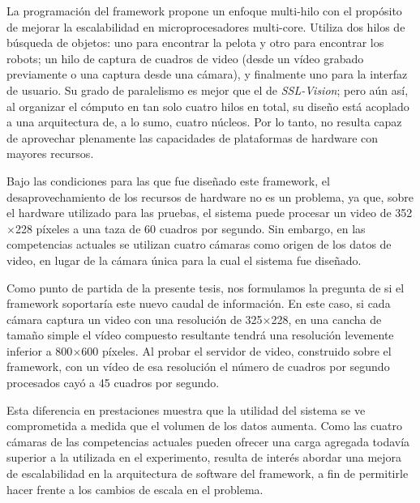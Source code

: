 La programación del framework propone un enfoque multi-hilo con el propósito de
mejorar la escalabilidad en microprocesadores multi-core. Utiliza dos hilos de
búsqueda de objetos: uno para encontrar la pelota y otro para encontrar los
robots; un hilo de captura de cuadros de video (desde un vídeo grabado
previamente o una captura desde una cámara), y finalmente uno para la interfaz
de usuario. Su grado de paralelismo es mejor que el de \emph{SSL-Vision}; pero
aún así, al organizar el cómputo en tan solo cuatro hilos en total, su diseño
está acoplado a una arquitectura de, a lo sumo, cuatro núcleos. Por lo tanto, no
resulta capaz de aprovechar plenamente las capacidades de plataformas de
hardware con mayores recursos.

Bajo las condiciones para las que fue diseñado este framework, el
desaprovechamiento de los recursos de hardware no es un problema, ya que, sobre
el hardware utilizado para las pruebas, el sistema puede procesar un video de
352$\times$228 píxeles a una taza de 60 cuadros por segundo. Sin embargo, en las
competencias actuales se utilizan cuatro cámaras como origen de los datos de
video, en lugar de la cámara única para la cual el sistema fue diseñado.

Como punto de partida de la presente tesis, nos formulamos la pregunta de si el
framework soportaría este nuevo caudal de información. En este caso, si cada
cámara captura un video con una resolución de 325$\times$228, en una cancha de
tamaño simple el vídeo compuesto resultante tendrá una resolución levemente
inferior a 800$\times$600 píxeles.  Al probar el servidor de video, construido
sobre el framework, con un vídeo de esa resolución el número de cuadros por
segundo procesados cayó a 45 cuadros por segundo.

Esta diferencia en prestaciones muestra que la utilidad del sistema se ve
comprometida a medida que el volumen de los datos aumenta. Como las cuatro
cámaras de las competencias actuales pueden ofrecer una carga agregada todavía
superior a la utilizada en el experimento, resulta de interés abordar una mejora
de escalabilidad en la arquitectura de software del framework, a fin de
permitirle hacer frente a los cambios de escala en el problema.
